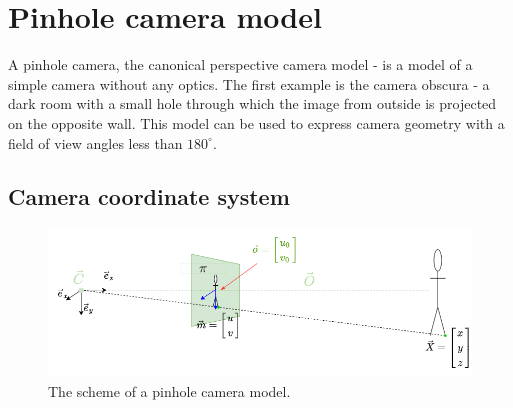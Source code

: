 



\section{Pinhole camera model}
\label{sec:pinhole_camera_model}
A pinhole camera, the canonical perspective camera model - is a model of a simple camera without any optics.
The first example is the camera obscura - a dark room with a small hole through which the image from outside is projected on the opposite wall. 
This model can be used to express camera geometry with a field of view angles less than $180^{\circ}$.

\subsection{Camera coordinate system}
\begin{figure}[ht]
    \centering
    \includegraphics[width=\textwidth]{graphics/td_scene.png}
    \caption{The scheme of a pinhole camera model.}
    \label{fig:td_scene_3d}
\end{figure}

